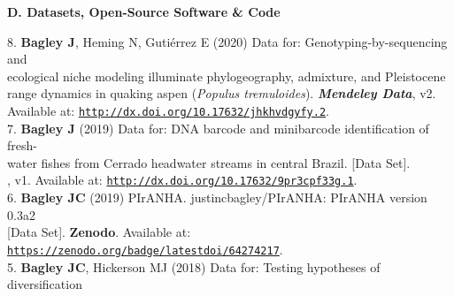 \documentclass[margin,line]{res}
\begin{document}
\begin{resume}
\textbf{D. Datasets, Open-Source Software \& Code}%

8. \textbf{Bagley J}, Heming N, Guti\'{e}rrez E (2020) Data for: Genotyping-by-sequencing and \\
\hspace*{8mm} ecological niche modeling illuminate phylogeography, admixture, and Pleistocene\\ %
\hspace*{8mm} range dynamics in quaking aspen (\textit{Populus tremuloides}). {\it \textbf{Mendeley Data}}, v2.\\ \vspace{2mm}
\hspace*{8mm}Available at: \href{http://dx.doi.org/10.17632/jhkhvdgyfy.2}{\tt http://dx.doi.org/10.17632/jhkhvdgyfy.2}. \\
7. \textbf{Bagley J} (2019) Data for: DNA barcode and minibarcode identification of fresh-\\
\hspace*{8mm} water fishes from Cerrado headwater streams in central Brazil. [Data Set].\\ \vspace{2mm}
, v1. Available at: \href{http://dx.doi.org/10.17632/9pr3cpf33g.1}{\tt http://dx.doi.org/10.17632/9pr3cpf33g.1}. \\
6. \textbf{Bagley JC} (2019) PIrANHA. justincbagley/PIrANHA: PIrANHA version 0.3a2\\ 
\hspace*{8mm} [Data Set]. \textbf{Zenodo}. Available at:\\ \vspace{2mm}
\hspace*{8mm}\href{https://zenodo.org/badge/latestdoi/64274217}{\tt https://zenodo.org/badge/latestdoi/64274217}. \\
5. \textbf{Bagley JC}, Hickerson MJ (2018) Data for: Testing hypotheses of diversification\\

\end{resume}
\end{document}
